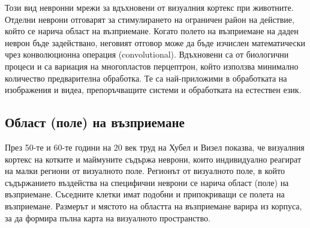 Този вид невронни мрежи за вдъхновени от визуалния кортекс при животните. Отделни неврони отговарят за стимулирането на ограничен район на действие, който се нарича област на възприемане. Когато полето на възприемане на даден неврон бъде задействано, неговият отговор може да бъде изчислен математически чрез конволюционна операция (convolutional). Вдъхновени са от биологични процеси и са вариация на многопластов перцептрон, който използва минимално количество предварителна обработка. Те са най-приложими в обработката на изображения и видеа, препоръчващите системи и обработката на естествен език. \cite{CNN_2} \cite{CNN_3}


\subsection{Област (поле) на възприемане}
През 50-те и 60-те години на 20 век труд на Хубел и Визел показва, че визуалния кортекс на котките и маймуните съдържа неврони, които индивидуално реагират на малки региони от визуалното поле. Регионът от визуалното поле, в който съдържанието въздейства на специфични неврони се нарича област (поле) на възприемане. Съседните клетки имат подобни и припокриващи се полета на възприемане. Размерът и мястото на областта на възприемане варира из корпуса, за да формира пълна карта на визуалното пространство. \cite{CNN_1}

